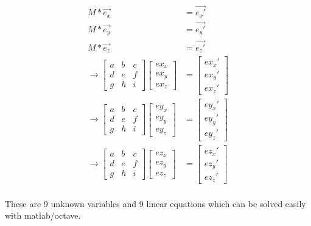 \begin{align*}
M*\vec{e_x}&=\vec{e_x'}\\
M*\vec{e_y}&=\vec{e_y'}\\
M*\vec{e_z}&=\vec{e_z'}\\
\rightarrow 
\begin{bmatrix}
a & b & c\\ d & e & f\\ g & h & i
\end{bmatrix}
\begin{bmatrix}ex_x\\ex_y\\ex_z\end{bmatrix} &= \begin{bmatrix}ex_{x}'\\ex_{y}'\\ex_{z}'\end{bmatrix}\\
\rightarrow 
\begin{bmatrix}
a & b & c\\ d & e & f\\ g & h & i
\end{bmatrix}
\begin{bmatrix}ey_x\\ey_y\\ey_z\end{bmatrix} &= \begin{bmatrix}ey_{x}'\\ey_{y}'\\ey_{z}'\end{bmatrix}\\
\rightarrow 
\begin{bmatrix}
a & b & c\\ d & e & f\\ g & h & i
\end{bmatrix}
\begin{bmatrix}ez_x\\ez_y\\ez_z\end{bmatrix} &= \begin{bmatrix}ez_{x}'\\ez_{y}'\\ez_{z}'\end{bmatrix}\\
\end{align*}  

These are 9 unknown variables and 9 linear equations which can be solved easily with matlab/octave.


